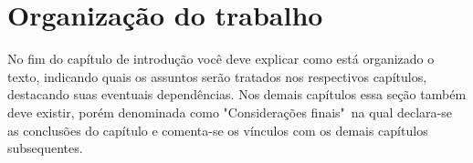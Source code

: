 \section{Organização do trabalho}
No fim do capítulo de introdução você deve explicar como está organizado o texto, indicando quais os assuntos serão tratados nos respectivos capítulos, destacando suas eventuais dependências. Nos demais capítulos essa seção também deve existir, porém denominada como "Considerações finais"\ na qual declara-se as conclusões do capítulo e comenta-se os vínculos com os demais capítulos subsequentes.
